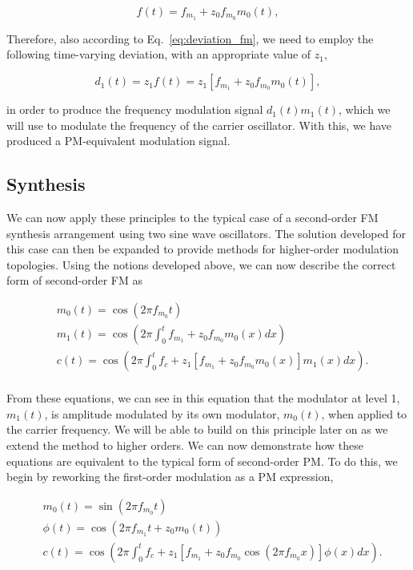 \documentclass[]{interact}
\begin{document}
\begin{equation}
f(t)  = f_{m_1} + z_{0} f_{m_0} m_0(t),
 \end{equation}

Therefore, also according to Eq.~\ref{eq:deviation_fm}, 
we need to employ the following time-varying deviation, 
with an appropriate value of $z_1$,

\begin{equation} \label{eq:deviation_stack}
d_1(t) = z_1 f(t) = z_1 [f_{m_1} + z_{0} f_{m_0} m_0(t)],
\end{equation}

\noindent in order to produce the frequency modulation signal $d_1(t)m_1(t)$, which
we will use to modulate the frequency of the carrier oscillator. With this, we
have produced a PM-equivalent modulation signal.

\subsection{Synthesis}

We can now apply these principles to the typical case of a second-order FM synthesis arrangement using two sine wave oscillators. The solution developed for this case can then be expanded to provide methods for higher-order modulation topologies. Using the notions developed above, we can now describe the correct form of second-order FM as

\begin{equation} \label{eq:fmstacked}
\begin{split}
&m_0(t) =  \cos(2\pi f_{m_0} t)\\
&m_1(t) = \cos\left(  2\pi\int_{0}^{t} f_{m_1} + z_0  f_{m_0} m_0(x)dx\right) \\
&c(t) =  \cos\left(2\pi \int_{0}^{t} f_c + z_1 [f_{m_1} + z_0 f_{m_0} m_0(x)] m_1(x) dx \right). \\
\end{split}
\end{equation}

From these equations, we can see in this equation that the modulator at level 1, $m_1(t)$, is amplitude modulated by its own modulator, $m_0(t)$, when applied to the carrier frequency. We will be able to build on this principle later on as we extend the method to higher orders.
We can now demonstrate how these equations are equivalent to the typical form
of second-order PM. To do this, we begin by reworking the first-order modulation 
as a PM expression,

\begin{equation}\label{eq:fm+pm}
\begin{split}
&m_0(t) = \sin(2\pi f_{m_0} t)\\
&\phi(t) = \cos(2\pi f_{m_1} t + z_0 m_0(t)) \\
&c(t) =  \cos\left(2\pi \int_{0}^{t} f_c + z_1 [f_{m_1} + z_0 f_{m_0}\cos(2\pi f_{m_0} x)] \phi(x) dx\right). \\
\end{split}
\end{equation}
\end{document}
